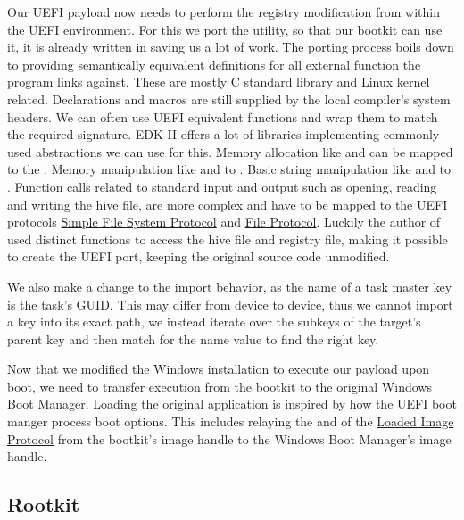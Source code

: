 Our \ac{UEFI} payload now needs to perform the registry modification from within the \ac{UEFI} environment.
For this we port the  utility, so that our bootkit can use it, it is already written in  saving us a lot of work.
The porting process boils down to providing semantically equivalent definitions for all external function the program links against.
These are mostly C standard library and Linux kernel related.
Declarations and macros are still supplied by the local compiler's system headers.
We can often use \ac{UEFI} equivalent functions and wrap them to match the required signature.
\ac{EDK} II offers a lot of libraries implementing commonly used abstractions we can use for this.
Memory allocation like  and  can be mapped to the .
Memory manipulation like  and  to .
Basic string manipulation like  and  to .
Function calls related to standard input and output such as opening, reading and writing the hive file, are more complex and have to be mapped to the \ac{UEFI} protocols \hyperref[lst:simple-file-system-protocol]{Simple File System Protocol} and \hyperref[lst:simple-file-system-protocol]{File Protocol}.
Luckily the author of  used distinct functions to access the hive file and registry file, making it possible to create the \ac{UEFI} port, keeping the original source code unmodified.

We also make a change to the import behavior, as the name of a task master key is the task's \ac{GUID}.
This may differ from device to device, thus we cannot import a key into its exact path, we instead iterate over the subkeys of the target's parent key and then match for the name value to find the right key.

Now that we modified the Windows installation to execute our payload upon boot, we need to transfer execution from the bootkit to the original Windows Boot Manager.
Loading the original application is inspired by how the \ac{UEFI} boot manger process boot options.
This includes relaying the  and  of the \hyperref[lst:loaded-image-protocol]{Loaded Image Protocol} from the bootkit's image handle to the Windows Boot Manager's image handle.

\subsection{Rootkit}

